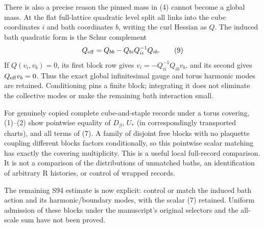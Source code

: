 \documentclass{article}
\begin{document}
There is also a precise reason the pinned mass in (4) cannot become a global mass. At the flat full-lattice quadratic level split all links into the cube coordinates $i$ and bath coordinates $b$, writing the curl Hessian as $Q$. The induced bath quadratic form is the Schur complement
\[
 Q_{\rm eff}=Q_{bb}-Q_{bi}Q_{ii}^{-1}Q_{ib}.
 \tag{9}
\]
If $Q(v_i,v_b)=0$, its first block row gives $v_i=-Q_{ii}^{-1}Q_{ib}v_b$, and its second gives $Q_{\rm eff}v_b=0$. Thus the exact global infinitesimal gauge and torus harmonic modes are retained. Conditioning pins a finite block; integrating it does not eliminate the collective modes or make the remaining bath interaction small.

For genuinely copied complete cube-and-staple records under a torus covering, (1)--(2) show pointwise equality of $D_\beta$, $U_*$ (in correspondingly transported charts), and all terms of (7). A family of disjoint free blocks with no plaquette coupling different blocks factors conditionally, so this pointwise scalar matching has exactly the covering multiplicity. This is a useful local full-record comparison. It is not a comparison of the distributions of unmatched baths, an identification of arbitrary R histories, or control of wrapped records.

The remaining S94 estimate is now explicit: control or match the induced bath action and its harmonic/boundary modes, with the scalar (7) retained. Uniform admission of these blocks under the manuscript's original selectors and the all-scale sum have not been proved.
\end{document}

